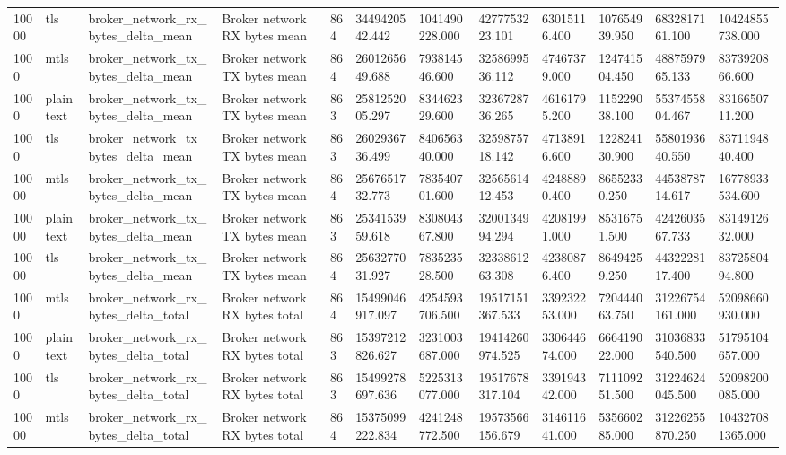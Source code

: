 \begin{longtable}{llllllllllll}
10000 & tls & broker\_network\_rx\_bytes\_delta\_mean & Broker network RX bytes mean & 864 & 3449420542.442 & 1041490228.000 & 4277753223.101 & 63015116.400 & 107654939.950 & 6832817161.100 & 10424855738.000 \\
1000 & mtls & broker\_network\_tx\_bytes\_delta\_mean & Broker network TX bytes mean & 864 & 2601265649.688 & 793814546.600 & 3258699536.112 & 47467379.000 & 124741504.450 & 4887597965.133 & 8373920866.600 \\
1000 & plaintext & broker\_network\_tx\_bytes\_delta\_mean & Broker network TX bytes mean & 863 & 2581252005.297 & 834462329.600 & 3236728736.265 & 46161795.200 & 115229038.100 & 5537455804.467 & 8316650711.200 \\
1000 & tls & broker\_network\_tx\_bytes\_delta\_mean & Broker network TX bytes mean & 863 & 2602936736.499 & 840656340.000 & 3259875718.142 & 47138916.600 & 122824130.900 & 5580193640.550 & 8371194840.400 \\
10000 & mtls & broker\_network\_tx\_bytes\_delta\_mean & Broker network TX bytes mean & 864 & 2567651732.773 & 783540701.600 & 3256561412.453 & 42488890.400 & 86552330.250 & 4453878714.617 & 16778933534.600 \\
10000 & plaintext & broker\_network\_tx\_bytes\_delta\_mean & Broker network TX bytes mean & 863 & 2534153959.618 & 830804367.800 & 3200134994.294 & 42081991.000 & 85316751.500 & 4242603567.733 & 8314912632.000 \\
10000 & tls & broker\_network\_tx\_bytes\_delta\_mean & Broker network TX bytes mean & 864 & 2563277031.927 & 783523528.500 & 3233861263.308 & 42380876.400 & 86494259.250 & 4432228117.400 & 8372580494.800 \\
1000 & mtls & broker\_network\_rx\_bytes\_delta\_total & Broker network RX bytes total & 864 & 15499046917.097 & 4254593706.500 & 19517151367.533 & 339232253.000 & 720444063.750 & 31226754161.000 & 52098660930.000 \\
1000 & plaintext & broker\_network\_rx\_bytes\_delta\_total & Broker network RX bytes total & 863 & 15397212826.627 & 3231003687.000 & 19414260974.525 & 330644674.000 & 666419022.000 & 31036833540.500 & 51795104657.000 \\
1000 & tls & broker\_network\_rx\_bytes\_delta\_total & Broker network RX bytes total & 863 & 15499278697.636 & 5225313077.000 & 19517678317.104 & 339194342.000 & 711109251.500 & 31224624045.500 & 52098200085.000 \\
10000 & mtls & broker\_network\_rx\_bytes\_delta\_total & Broker network RX bytes total & 864 & 15375099222.834 & 4241248772.500 & 19573566156.679 & 314611641.000 & 535660285.000 & 31226255870.250 & 104327081365.000 \\

\end{longtable}

